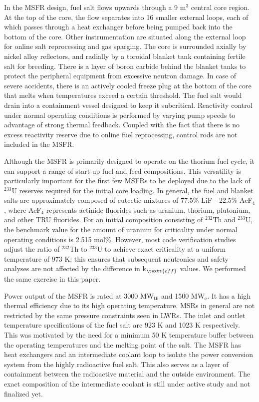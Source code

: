 In the \gls{MSFR} design, fuel salt flows upwards through a 9 m$^3$ central
core region. At the top of the core, the flow separates into 16 smaller
external loops, each of which passes through a heat exchanger before being
pumped back into the bottom of the core. Other instrumentation are situated
along the external loop for online salt reprocessing and gas sparging. The
core is surrounded axially by nickel alloy reflectors, and radially by a
toroidal blanket tank containing fertile salt for breeding. There is a layer
of boron carbide behind the blanket tanks to protect the peripheral equipment
from excessive neutron damage. In case of severe accidents, there is an
actively cooled freeze plug at the bottom of the core that melts when
temperatures exceed a certain threshold. The fuel salt would drain into a
containment vessel designed to keep it subcritical. Reactivity control under
normal operating conditions is performed by varying pump speeds to advantage
of strong thermal feedback. Coupled with the fact that there is no excess
reactivity reserve due to online fuel reprocessing, control rods are not
included in the \gls{MSFR}.

Although the \gls{MSFR} is primarily designed to operate on the thorium fuel
cycle, it can support a range of start-up fuel and feed compositions. This
versatility is particularly important for the first few \glspl{MSFR} to be
deployed due to the lack of $^{233}$U reserves required for the initial core
loading. In general, the fuel and blanket salts are approximately composed of
eutectic mixtures of 77.5\% LiF - 22.5\% AcF$_4$, where AcF$_4$ represents
actinide fluorides such as uranium, thorium, plutonium, and other \gls{TRU}
fluorides. For an initial composition consisting of $^{232}$Th and $^{233}$U,
the benchmark value for the amount of uranium for criticality under
normal operating conditions is 2.515 mol\%. However, most code verification
studies adjust the ratio of $^{232}$Th to $^{233}$U to achieve exact
criticality at a uniform temperature of 973 K; this ensures that subsequent
neutronics and safety analyses are not affected by the difference in
k$_{\textt{eff}}$ values. We performed the same exercise in this paper.

Power output of the \gls{MSFR} is rated at 3000 MW$_{\text{th}}$ and 1500
MW$_{\text{e}}$. It has a high thermal efficiency due to its high operating
temperature. \glspl{MSR} in general are not restricted by the same pressure
constraints seen in \glspl{LWR}. The inlet and outlet temperature
specifications of the fuel salt are 923 K and 1023 K respectively. This was
motivated by the need for a minimum 50 K temperature buffer between the
operating temperatures and the melting point of the salt. The \gls{MSFR} has
heat exchangers and an intermediate coolant loop to isolate the power
conversion system from the highly radioactive fuel salt. This also serves as
a layer of containment between the radioactive material and the outside
environment. The exact composition of the intermediate coolant is still under
active study and not finalized yet.
